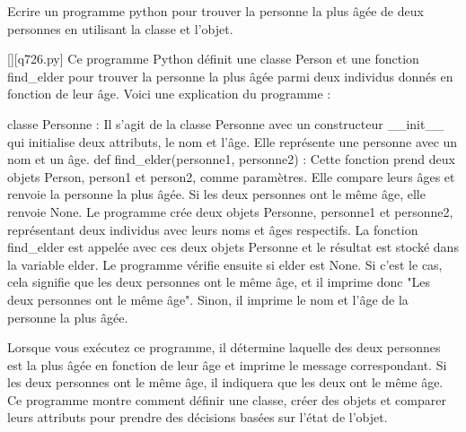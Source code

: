         \question
        Ecrire un programme python pour trouver la personne la plus âgée de deux personnes en utilisant la classe et l'objet.
        \par
        \begin{solution}
            \renewcommand{\nomfichier}{q726.py}
            \pythonfile{\chemincode \nomfichier}[][\nomfichier]
            Ce programme Python définit une classe Person et une fonction find_elder pour trouver la personne la plus âgée parmi deux individus donnés en fonction de leur âge. Voici une explication du programme :

    classe Personne : Il s'agit de la classe Personne avec un constructeur __init__ qui initialise deux attributs, le nom et l'âge. Elle représente une personne avec un nom et un âge.
    def find_elder(personne1, personne2) : Cette fonction prend deux objets Person, person1 et person2, comme paramètres. Elle compare leurs âges et renvoie la personne la plus âgée. Si les deux personnes ont le même âge, elle renvoie None.
    Le programme crée deux objets Personne, personne1 et personne2, représentant deux individus avec leurs noms et âges respectifs.
    La fonction find_elder est appelée avec ces deux objets Personne et le résultat est stocké dans la variable elder.
    Le programme vérifie ensuite si elder est None. Si c'est le cas, cela signifie que les deux personnes ont le même âge, et il imprime donc "Les deux personnes ont le même âge". Sinon, il imprime le nom et l'âge de la personne la plus âgée.

Lorsque vous exécutez ce programme, il détermine laquelle des deux personnes est la plus âgée en fonction de leur âge et imprime le message correspondant. Si les deux personnes ont le même âge, il indiquera que les deux ont le même âge. Ce programme montre comment définir une classe, créer des objets et comparer leurs attributs pour prendre des décisions basées sur l'état de l'objet.
        \end{solution}
        

